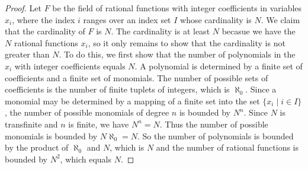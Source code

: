 \documentclass[12pt]{article}
\begin{document}
\begin{proof}
Let $F$ be the field of rational functions with integer coefficients in 
variables $x_i$, where the index $i$ ranges over an index set $I$ 
whose cardinality is $N$.  We claim that the cardinality of $F$ is $N$. 
The cardinality is at least $N$ becasue we have the $N$ rational functions
$x_i$, so it only remains to show that the cardinality is not greater
than $N$.  To do this, we first show that the number of polynomials in
the $x_i$ with integer coefficients equals $N$.  A polynomial is 
determined by a finite set of coefficients and a finite set of monomials.
The number of possible sets of coefficients is the number of finite 
tuplets of integers, which is $\aleph_0$.  Since a monomial may be determined 
by a mapping of a finite set into the set $\{ x_i \mid i \in I \}$, the number 
of possible monomials of degree $n$ is bounded by $N^n$.  Since $N$ is
transfinite and $n$ is finite, we have $N^n = N$.  Thus the number of 
possible monomials is bounded by $N \aleph_0 = N$.  So the number of 
polynomials is bounded by the product of $\aleph_0$ and $N$, which is
$N$ and the number of rational functions is bounded by $N^2$, which
equals $N$.
\end{proof}

\end{document}
